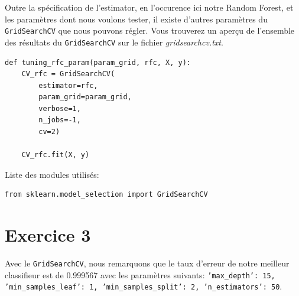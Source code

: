 \documentclass[a4paper, 12pt, oneside]{book}
\begin{document}
Outre la spécification de l'estimator, en l'occurence ici notre Random Forest, et les paramètres dont nous voulons tester, il existe d'autres paramètres du \texttt{GridSearchCV} que nous pouvons régler.
\newline
Vous trouverez un aperçu de l'ensemble des résultats du \texttt{GridSearchCV} sur le fichier \textit{gridsearchcv.txt}.
\begin{verbatim}
def tuning_rfc_param(param_grid, rfc, X, y):
    CV_rfc = GridSearchCV(
        estimator=rfc, 
        param_grid=param_grid,
        verbose=1,
        n_jobs=-1,
        cv=2)

    CV_rfc.fit(X, y)
\end{verbatim}

Liste des modules utilisés: 
\begin{verbatim}
from sklearn.model_selection import GridSearchCV
\end{verbatim}



\section{Exercice 3}
Avec le \texttt{GridSearchCV}, nous remarquons que le taux d'erreur de notre meilleur classifieur est de 0.999567 avec les paramètres suivants: \texttt{{'max\_depth': 15, 'min\_samples\_leaf': 1, 'min\_samples\_split': 2, 'n\_estimators': 50}}.
\end{document}
